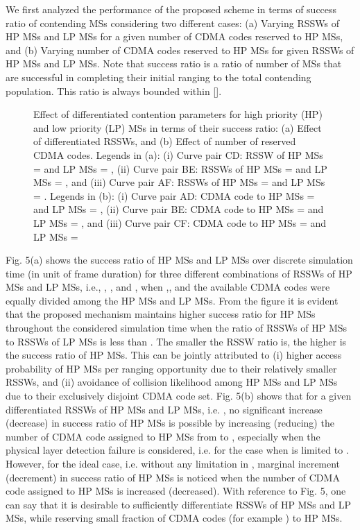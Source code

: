 \documentclass[preprint,12pt]{elsarticle}
\begin{document}
We first analyzed the performance of the proposed scheme in terms of success ratio of contending MSs considering two different cases: (a) Varying RSSWs of HP MSs and LP MSs for a given number of CDMA codes reserved to HP MSs, and (b) Varying number of CDMA codes reserved to HP MSs for given RSSWs of HP MSs and LP MSs. Note that success ratio is a ratio of number of MSs that are successful in completing their initial ranging to the total contending population. This ratio is always bounded within [].


\begin{figure}[h]
\centering
{}
\caption{Effect of differentiated contention parameters for high priority (HP) and low priority (LP) MSs in terms of their success ratio: (a) Effect of differentiated RSSWs, and (b) Effect of number of reserved CDMA codes. Legends in (a): (i) Curve pair CD: RSSW of HP MSs =  and LP MSs = , (ii) Curve pair BE: RSSWs of HP MSs =  and LP MSs = , and (iii) Curve pair AF: RSSWs of HP MSs =  and LP MSs = . Legends in (b): (i) Curve pair AD: CDMA code to HP MSs =  and LP MSs = , (ii) Curve pair BE: CDMA code to HP MSs =  and LP MSs = , and (iii) Curve pair CF: CDMA code to HP MSs =  and LP MSs = }
\end{figure}

Fig. 5(a) shows the success ratio of HP MSs and LP MSs over discrete simulation time (in unit of frame duration) for three different combinations of RSSWs of HP MSs and LP MSs, i.e., , , and , when ,, and the available  CDMA codes were equally divided among the HP MSs and LP MSs. From the figure it is evident that the proposed mechanism maintains higher success ratio for HP MSs throughout the considered simulation time when the ratio of RSSWs of HP MSs to RSSWs of LP MSs is less than . The smaller the RSSW ratio is, the higher is the success ratio of HP MSs. This can be jointly attributed to (i) higher access probability of HP MSs per ranging opportunity due to their relatively smaller RSSWs, and (ii) avoidance of collision likelihood among HP MSs and LP MSs due to their exclusively disjoint CDMA code set. Fig. 5(b) shows that for a given differentiated RSSWs of HP MSs and LP MSs, i.e. , no significant increase (decrease) in success ratio of HP MSs is possible by increasing (reducing) the number of CDMA code assigned to HP MSs from  to  , especially when the physical layer detection failure is considered, i.e. for the case when  is limited to . However, for the ideal case, i.e. without any limitation in , marginal increment (decrement) in success ratio of HP MSs is noticed when the number of CDMA code assigned to HP MSs is increased (decreased). With reference to Fig. 5, one can say that it is desirable to sufficiently differentiate RSSWs of HP MSs and LP MSs, while reserving small fraction of CDMA codes (for example ) to HP MSs.
\end{document}
